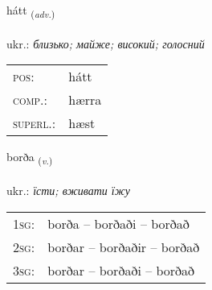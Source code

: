 \documentclass[frontgrid, backgrid]{flacards}\usepackage[]{graphicx}\usepackage[]{xcolor}
\begin{document}
\renewcommand{\flhead}{\vskip5pt \fboxsep=0pt {\small\bfseries\footnotesize Atviksorð | прислівник}}
\renewcommand{\fcfoot}{\vskip5pt \fboxsep=0pt \hspace{2pt}{\small\bfseries\footnotesize 1K}}

\renewcommand{\blhead}{\vskip5pt {\small\bfseries\footnotesize Atviksorð | прислівник }}
\renewcommand{\bcfoot}{\vskip5pt \hspace{2pt}{\small\bfseries\footnotesize 1K}}


{hátt \small{\textsubscript{(\textit{adv.})}} \\[1ex] %
\textphonetic{[hauht]} \\
ukr.: \emph{близько; майже; високий; голосний} \\  [2ex]
\renewcommand*{\arraystretch}{0.8}
\begin{tabular}{ll}
\textsc{pos}: & hátt \\ 
\textsc{comp.}: & hærra \\ 
\textsc{superl.}: & hæst \\
\end{tabular}
}

\renewcommand{\flhead}{\vskip5pt \fboxsep=0pt {\small\bfseries\footnotesize Sagnorð | дієслово}}
\renewcommand{\fcfoot}{\vskip5pt \fboxsep=0pt \hspace{2pt}{\small\bfseries\footnotesize 1K}}

\renewcommand{\blhead}{\vskip5pt {\small\bfseries\footnotesize Sagnorð | дієслово }}
\renewcommand{\bcfoot}{\vskip5pt \hspace{2pt}{\small\bfseries\footnotesize 1K}}


{borða \small{\textsubscript{(\textit{v.})}} \\[1ex] %
\textphonetic{[pɔrða]} \\
ukr.: \emph{їсти; вживати їжу} \\  [2ex]
\renewcommand*{\arraystretch}{0.8}
\begin{tabular}{p{1cm}l}
\textsc{1sg}: & borða -- borðaði -- borðað \\ 
\textsc{2sg}: & borðar -- borðaðir -- borðað \\ 
\textsc{3sg}: & borðar -- borðaði -- borðað \\ 
\end{tabular}
}
\end{document}
